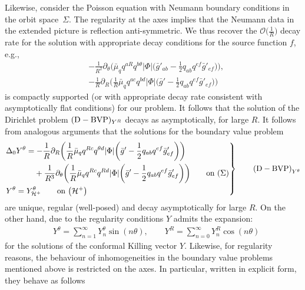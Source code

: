 \documentclass[pdftex]{sigma}
\def\ptl{\partial}%
\def\halb{\frac{1}{2}}%
\numberwithin{equation}{section}
\begin{document}
Likewise, consider the Poisson equation with Neumann boundary conditions in the orbit space~$\Sigma$. The regularity at the axes implies that the Neumann data in the extended picture is reflection anti-symmetric. We thus recover the $\mathcal{O} \bigl(\frac{1}{R}\bigr)$ decay rate for the solution with appropriate decay conditions for the source function $f$, e.g.,
\begin{align*}
&-\frac{1}{R^2} \ptl_ \theta \biggl(\bar{\mu}_q q^{aR} q^{b \theta} \vert \Phi \vert \biggl(\bar{g}'_{ab} - \halb q_{ab} q^{ef} \bar{g}'_{ef}\biggr)\biggr), \\
&- \frac{1}{R} \ptl_R \biggl(\frac{1}{R} \bar{\mu}_q q^{ac} q^{bd} \vert \Phi \vert \biggl(\bar{g}' - \halb q_{ab} q^{ef} \bar{g}'_{ef}\biggr)\biggr)
\end{align*}
is compactly supported (or with appropriate decay rate consistent with asymptotically flat conditions) for our problem.
It follows that the solution of the Dirichlet problem $({\rm D-BVP})_{Y^R}$ decays as
 asymptotically, for large $R$. It follows from analogous arguments that the solutions for the boundary value problem
\begin{equation*}
\left.\begin{aligned}
&\Delta_0 Y^\theta= - \frac{1}{R} \ptl_R \biggl(\frac{1}{R} \bar{\mu}_q q^{Rc} q^{\theta d} \vert \Phi \vert \biggl(\bar{g}' - \halb q_{ab} q^{ef} \bar{g}'_{ef}\biggr)\biggr)
\notag\\
&\hphantom{\Delta_0 Y^\theta=}{}
+ \frac{1}{R^3} \ptl_\theta \biggl(\frac{1}{R} \bar{\mu}_q q^{Rc} q^{Rd} \vert \Phi \vert \biggl(\bar{g}' - \halb q_{ab} q^{ef} \bar{g}'_{ef}\biggr)\biggr) \qquad \text{on} \ (\Sigma)\\
&Y^\theta= Y^\theta_{\mathcal{H}^+} \qquad \text{on} \ \bigl(\mathcal{H}^+\bigr)
\end{aligned}
 \right\}
\tag*{${\rm (D-BVP)}_{Y^\theta}$}
\end{equation*}
are unique, regular (well-posed) and decay  asymptotically for large $R$.
On the other hand, due to the regularity conditions $Y$ admits the expansion:
	\begin{align*}
	&Y^{\theta}= \sum^{\infty}_{n=1} Y^{\theta}_n \sin (n \theta), \qquad
	Y^{R}= \sum^{\infty}_{n=0} Y^R_n \cos(n \theta)
	\end{align*}
for the solutions of the conformal Killing vector $Y$. Likewise, for regularity reasons, the behaviour of inhomogeneities in the boundary value problems mentioned above is restricted on the axes. In particular, written in explicit form, they behave as follows
\end{document}

